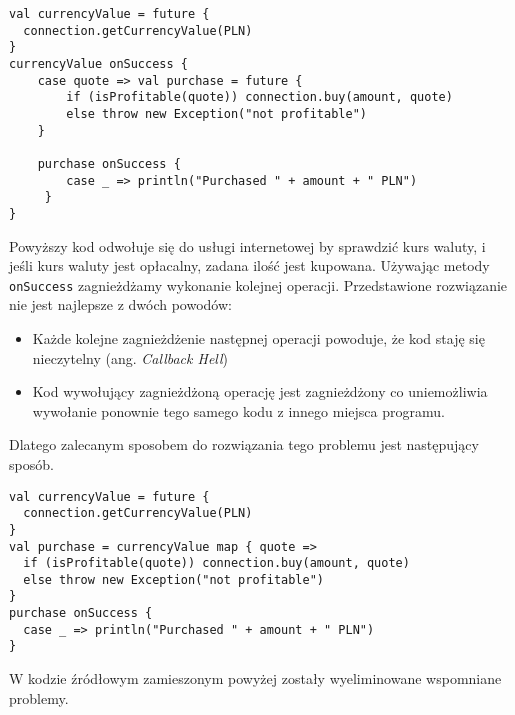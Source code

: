 \begin{lstlisting}
val currencyValue = future {
  connection.getCurrencyValue(PLN)
}
currencyValue onSuccess { 
	case quote => val purchase = future {
		if (isProfitable(quote)) connection.buy(amount, quote)
		else throw new Exception("not profitable")
	}
  
	purchase onSuccess {
		case _ => println("Purchased " + amount + " PLN")
	 }
}
\end{lstlisting}

Powyższy kod odwołuje się do usługi internetowej by sprawdzić kurs waluty, i jeśli kurs waluty jest opłacalny, zadana ilość jest kupowana.
Używając metody \lstinline{onSuccess} zagnieżdżamy wykonanie kolejnej operacji. Przedstawione rozwiązanie nie jest najlepsze z dwóch powodów:
\begin{itemize}
	\item Każde kolejne zagnieżdżenie następnej operacji powoduje, że kod staję się nieczytelny (ang. \emph{Callback Hell})
	\item Kod wywołujący zagnieżdżoną operację jest zagnieżdżony co uniemożliwia wywołanie ponownie tego samego kodu z innego miejsca programu.
\end{itemize}

Dlatego zalecanym sposobem do rozwiązania tego problemu jest następujący sposób.

\begin{lstlisting}
val currencyValue = future {
  connection.getCurrencyValue(PLN)
}
val purchase = currencyValue map { quote => 
  if (isProfitable(quote)) connection.buy(amount, quote)
  else throw new Exception("not profitable")
}
purchase onSuccess {
  case _ => println("Purchased " + amount + " PLN")
}
\end{lstlisting}

W kodzie źródłowym zamieszonym powyżej zostały wyeliminowane wspomniane problemy. 

